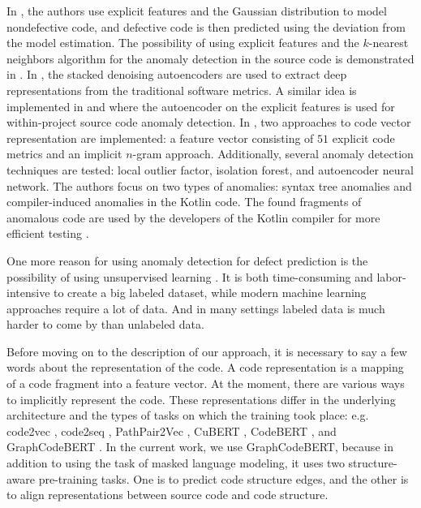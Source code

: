 \documentclass[10pt,conference]{IEEEtran}
\begin{document}
In \cite{NeelaEtAl2017}, the authors use explicit features and the Gaussian distribution to model nondefective code,
 and defective code is then predicted using the deviation from the model estimation.
The possibility of using explicit features and the $k$-nearest neighbors algorithm
  for the anomaly detection in the source code is demonstrated in \cite{MoshtariEtAl2020}.
In \cite{TongEtAl2018}, the stacked denoising autoencoders \cite{VincentEtAl2010}
 are used to extract deep representations from the traditional software metrics.
A similar idea is implemented in \cite{SakuradaYairi2014} and  \cite{AfricEtAl2020}
 where the autoencoder on the explicit features is used for within-project source code anomaly detection.
In \cite{BryksinEtAl2020}, two approaches to code vector representation are implemented:
 a feature vector consisting of $51$ explicit code metrics and an implicit $n$-gram approach.
Additionally, several anomaly detection techniques are tested:
 local outlier factor, isolation forest, and autoencoder neural network.
The authors focus on two types of anomalies: syntax tree anomalies and compiler-induced anomalies in the Kotlin code.
The found fragments of anomalous code are used by the developers of the Kotlin compiler for more efficient testing \cite{BryksinEtAl2020}.

One more reason for using anomaly detection for defect prediction is the possibility of using unsupervised learning \cite{AllamanisEtAl2021}.
It is both time-consuming and labor-intensive to create a big labeled dataset,
while modern machine learning approaches require a lot of data.
And in many settings labeled data is much harder to come by than unlabeled data.

Before moving on to the description of our approach, it is necessary to say a few words about the representation of the code.
A code representation is a mapping of a code fragment into a feature vector.
At the moment, there are various ways to implicitly represent the code.
These representations differ in the underlying architecture and the types of tasks on which the training took place:
 e.g. code2vec \cite{AlonEtAl2019vec}, code2seq \cite{AlonEtAl2019seq}, PathPair2Vec \cite{ShiEtAl2020}, CuBERT \cite{KanadeEtAl2020}, CodeBERT \cite{FengEtAl2020},
 and GraphCodeBERT \cite{GuoEtAl2021}.
In the current work, we use GraphCodeBERT, because in addition to using the task of masked language modeling,
 it uses two structure-aware pre-training tasks.
One is to predict code structure edges, and the other is to align representations between source code and code structure. 
\end{document}

